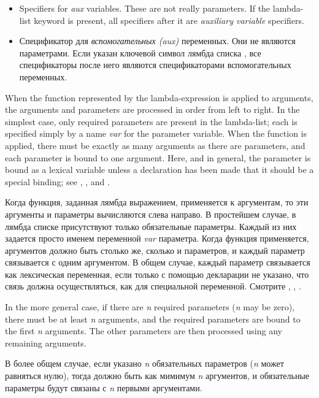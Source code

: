 \begin{itemize}
\item
Specifiers for \textit{aux} variables.  These are not really parameters.
If the lambda-list keyword  is present, all specifiers after it are
\textit{auxiliary variable} specifiers.

\item
Спецификатор для \textit{вспомогательных (aux)} переменных. Они не являются
параметрами. Если указан ключевой символ лямбда списка , все
спецификаторы после него являются спецификаторами вспомогательных переменных.
\end{itemize}

When the function represented by the lambda-expression is applied
to arguments, the arguments and parameters are processed in order
from left to right.
In the simplest case, only required parameters are present
in the lambda-list; each is specified simply by a name \textit{var} for
the parameter variable.
When the function is applied,
there must be exactly as many arguments as there are parameters,
and each parameter is bound to one argument.  Here, and in general,
the parameter is bound as a lexical variable unless a
declaration has been made that it should be a special binding;
see , , and .

Когда функция, заданная лямбда выражением, применяется к аргументам, то эти
аргументы и параметры вычисляются слева направо.
В простейшем случае, в лямбда списке присутствуют только обязательные
параметры. Каждый из них задается просто именем переменной \textit{var}
параметра.
Когда функция применяется, аргументов должно быть столько же, сколько и
параметров, и каждый параметр связывается с одним аргументом. В общем случае,
каждый параметр связывается как лексическая переменная, если только с помощью
декларации не указано, что связь должна осуществляться, как для специальной
переменной. Смотрите , , .

In the more general case, if there are \textit{n} required parameters
(\textit{n} may be zero), there must be at least \textit{n} arguments,
and the required parameters are bound to the first \textit{n} arguments.
The other parameters are then processed using any remaining arguments.

В более общем случае, если указано \textit{n} обязательных параметров
(\textit{n} может равняться нулю), тогда должно быть как мимимум \textit{n}
аргументов, и обязательные параметры будут связаны с \textit{n} первыми
аргументами.

